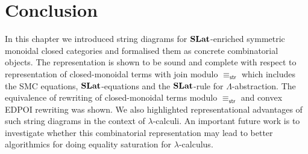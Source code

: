 \section{Conclusion}
In this chapter we introduced string diagrams for $\mathbf{SLat}$-enriched symmetric monoidal closed categories and formalised them as concrete combinatorial objects.
The representation is shown to be sound and complete with respect to representation of closed-monoidal terms with join modulo $\equiv_{\mathsf{str}}$ which includes the SMC equations, $\mathbf{SLat}$-equations and the $\mathbf{SLat}$-rule for $\Lambda$-abstraction.
The equivalence of rewriting of closed-monoidal terms modulo $\equiv_{\mathsf{str}}$ and convex EDPOI rewriting was shown.
We also highlighted representational advantages of such string diagrams in the context of $\lambda$-calculi.
An important future work is to investigate whether this combinatorial representation may lead to better algorithmics for doing equality saturation for $\lambda$-calculus.